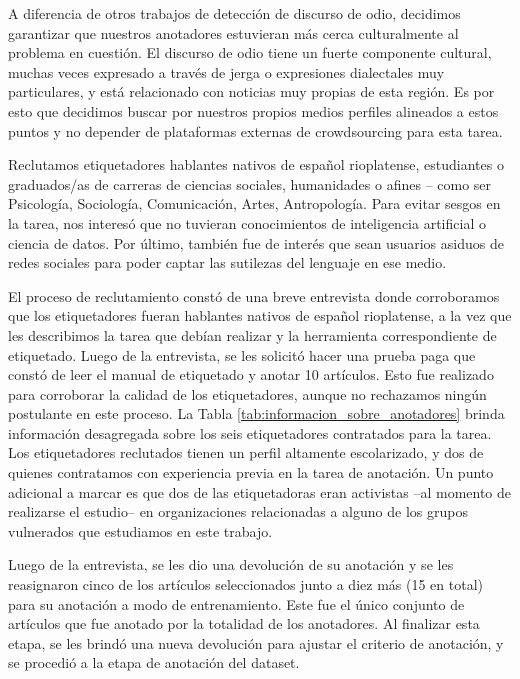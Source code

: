 A diferencia de otros trabajos de detección de discurso de odio, decidimos garantizar que nuestros anotadores estuvieran más cerca culturalmente al problema en cuestión. El discurso de odio tiene un fuerte componente cultural, muchas veces expresado a través de jerga o expresiones dialectales muy particulares, y está relacionado con noticias muy propias de esta región. Es por esto que decidimos buscar por nuestros propios medios perfiles alineados a estos puntos y no depender de plataformas externas de crowdsourcing para esta tarea.

Reclutamos etiquetadores hablantes nativos de español rioplatense, estudiantes o graduados/as de carreras de ciencias sociales, humanidades o afines -- como ser Psicología, Sociología, Comunicación, Artes, Antropología. Para evitar sesgos en la tarea, nos interesó que no tuvieran conocimientos de inteligencia artificial o ciencia de datos. Por último, también fue de interés que sean usuarios asiduos de redes sociales para poder captar las sutilezas del lenguaje en ese medio.

El proceso de reclutamiento constó de una breve entrevista donde corroboramos que los etiquetadores fueran hablantes nativos de español rioplatense, a la vez que les describimos la tarea que debían realizar y la herramienta correspondiente de etiquetado. Luego de la entrevista, se les solicitó hacer una prueba paga que constó de leer el manual de etiquetado y anotar 10 artículos. Esto fue realizado para corroborar la calidad de los etiquetadores, aunque no rechazamos ningún postulante en este proceso. La Tabla \ref{tab:informacion_sobre_anotadores} brinda información desagregada sobre los seis etiquetadores contratados para la tarea. Los etiquetadores reclutados tienen un perfil altamente escolarizado, y dos de quienes contratamos con experiencia previa en la tarea de anotación. Un punto adicional a marcar es que dos de las etiquetadoras eran activistas --al momento de realizarse el estudio-- en organizaciones relacionadas a alguno de los grupos vulnerados que estudiamos en este trabajo.

Luego de la entrevista, se les dio una devolución de su anotación y se les reasignaron cinco de los artículos seleccionados junto a diez más (15 en total) para su anotación a modo de entrenamiento. Este fue el único conjunto de artículos que fue anotado por la totalidad de los anotadores. Al finalizar esta etapa, se les brindó una nueva devolución para ajustar el criterio de anotación, y se procedió a la etapa de anotación del dataset.

